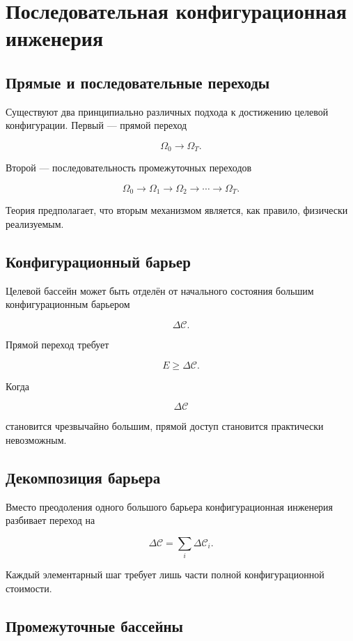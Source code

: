 \chapter{Последовательная конфигурационная инженерия}

\section{Прямые и последовательные переходы}

Существуют два принципиально различных подхода к достижению целевой конфигурации. Первый — прямой переход

\[ \Omega_0 \rightarrow \Omega_T. \]

Второй — последовательность промежуточных переходов

\[ \boxed{ \Omega_0 \rightarrow \Omega_1 \rightarrow \Omega_2 \rightarrow \cdots \rightarrow \Omega_T. } \]

Теория предполагает, что вторым механизмом является, как правило, физически реализуемым.

\section{Конфигурационный барьер}

Целевой бассейн может быть отделён от начального состояния большим конфигурационным барьером

\[ \Delta\mathcal C. \]

Прямой переход требует

\[ E \ge \Delta\mathcal C. \]

Когда

\[ \Delta\mathcal C \]

становится чрезвычайно большим, прямой доступ становится практически невозможным.

\section{Декомпозиция барьера}

Вместо преодоления одного большого барьера конфигурационная инженерия разбивает переход на

\[ \Delta\mathcal C = \sum_i \Delta\mathcal C_i. \]

Каждый элементарный шаг требует лишь части полной конфигурационной стоимости.

\section{Промежуточные бассейны}

